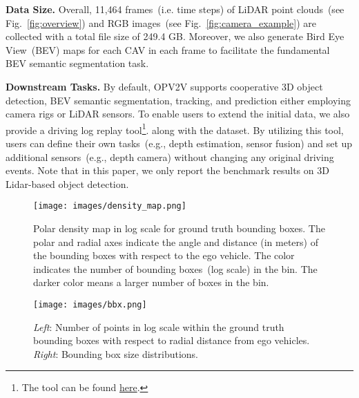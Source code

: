 \documentclass[letterpaper, 10 pt, conference]{ieeeconf}
\begin{document}
\noindent\textbf{Data Size.} Overall, 11,464 frames~(i.e. time steps) of LiDAR point clouds~(see Fig.~\ref{fig:overview}) and RGB images~(see Fig.~\ref{fig:camera_example}) are collected with a total file size of 249.4 GB. Moreover, we also generate Bird Eye View~(BEV) maps for each CAV in each frame to facilitate the fundamental BEV semantic segmentation task.

\noindent\textbf{Downstream Tasks.} By default, OPV2V supports cooperative 3D object detection, BEV semantic segmentation, tracking, and prediction either employing camera rigs or LiDAR sensors. To enable users to extend the initial data, we also provide a driving log replay tool\footnote{The tool can be found  \textcolor{blue}{\href{https://github.com/DerrickXuNu/OpenCOOD/tree/feature/log_replay/logreplay}{here}}.}.  along with the dataset. By utilizing this tool, users can define their own tasks~(e.g., depth estimation, sensor fusion) and set up additional sensors~(e.g., depth camera) without changing any original driving events. Note that in this paper, we only report the benchmark results on 3D Lidar-based object detection.

\begin{figure}
    \centering
    \texttt{[image: images/density\_map.png]}
    \caption{Polar density map in log scale for ground truth bounding boxes. The polar and radial axes indicate the angle and distance (in meters) of the bounding boxes with respect to the ego vehicle. The color indicates the number of bounding boxes~(log scale) in the bin. The darker color means a larger number of boxes in the bin.}
    \label{fig:angle_density_map}
\end{figure}
\begin{figure}
    \centering
    \texttt{[image: images/bbx.png]}
    \caption{\emph{Left}: Number of points in log scale within the ground truth bounding boxes with respect to radial distance from ego vehicles. \emph{Right}: Bounding box size distributions. }
    \label{fig:bbx_dist}
\end{figure}
\end{document}

